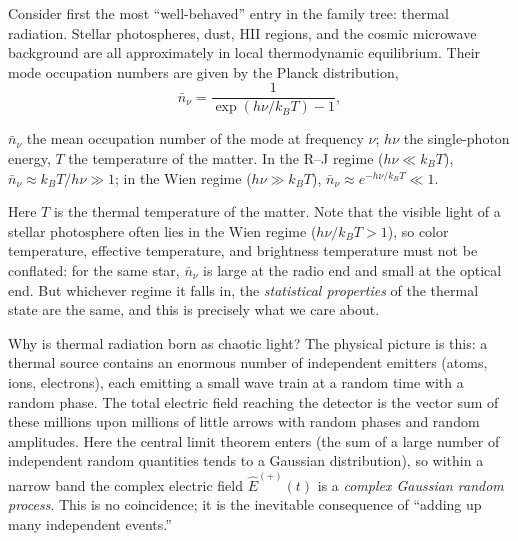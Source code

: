 Consider first the most ``well-behaved'' entry in the family tree: thermal radiation. Stellar photospheres, dust, HII regions, and the cosmic microwave background are all approximately in local thermodynamic equilibrium. Their mode occupation numbers are given by the Planck distribution,
\begin{equation}
  \bar n_\nu=\frac{1}{\exp(h\nu/k_BT)-1},
  \label{eq:e16-planck-occupation}
\end{equation}
\begin{formulaexplain}
\(\bar n_\nu\) the mean occupation number of the mode at frequency \(\nu\); \(h\nu\) the single-photon energy, \(T\) the temperature of the matter. In the R--J regime (\(h\nu\ll k_BT\)), \(\bar n_\nu\approx k_BT/h\nu\gg1\); in the Wien regime (\(h\nu\gg k_BT\)), \(\bar n_\nu\approx e^{-h\nu/k_BT}\ll1\).
\end{formulaexplain}
Here \(T\) is the thermal temperature of the matter. Note that the visible light of a stellar photosphere often lies in the Wien regime (\(h\nu/k_BT>1\)), so color temperature, effective temperature, and brightness temperature must not be conflated: for the same star, \(\bar n_\nu\) is large at the radio end and small at the optical end. But whichever regime it falls in, the \emph{statistical properties} of the thermal state are the same, and this is precisely what we care about.

Why is thermal radiation born as chaotic light? The physical picture is this: a thermal source contains an enormous number of independent emitters (atoms, ions, electrons), each emitting a small wave train at a random time with a random phase. The total electric field reaching the detector is the vector sum of these millions upon millions of little arrows with random phases and random amplitudes. Here the central limit theorem enters (the sum of a large number of independent random quantities tends to a Gaussian distribution), so within a narrow band the complex electric field \(\hat E^{(+)}(t)\) is a \emph{complex Gaussian random process}. This is no coincidence; it is the inevitable consequence of ``adding up many independent events.''

